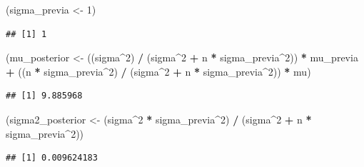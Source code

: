 \documentclass[
  12pt,
]{book}
\newenvironment{Shaded}{\begin{snugshade}}{\end{snugshade}}
\newcommand{\DecValTok}[1]{\textcolor[rgb]{0.00,0.00,0.81}{#1}}
\newcommand{\NormalTok}[1]{#1}
\newcommand{\OperatorTok}[1]{\textcolor[rgb]{0.81,0.36,0.00}{\textbf{#1}}}
\newcommand{\StringTok}[1]{\textcolor[rgb]{0.31,0.60,0.02}{#1}}
\begin{document}
\begin{Shaded}
\begin{Highlighting}[]
\NormalTok{(sigma\_previa \textless{}{-}}\StringTok{ }\DecValTok{1}\NormalTok{)}
\end{Highlighting}
\end{Shaded}

\begin{verbatim}
## [1] 1
\end{verbatim}

\begin{Shaded}
\begin{Highlighting}[]
\NormalTok{(mu\_posterior \textless{}{-}}\StringTok{ }\NormalTok{((sigma}\OperatorTok{\^{}}\DecValTok{2}\NormalTok{) }\OperatorTok{/}\StringTok{ }\NormalTok{(sigma}\OperatorTok{\^{}}\DecValTok{2} \OperatorTok{+}\StringTok{ }\NormalTok{n }\OperatorTok{*}\StringTok{ }\NormalTok{sigma\_previa}\OperatorTok{\^{}}\DecValTok{2}\NormalTok{)) }\OperatorTok{*}\StringTok{ }\NormalTok{mu\_previa }\OperatorTok{+}\StringTok{ }\NormalTok{((n }\OperatorTok{*}\StringTok{ }\NormalTok{sigma\_previa}\OperatorTok{\^{}}\DecValTok{2}\NormalTok{) }\OperatorTok{/}\StringTok{ }\NormalTok{(sigma}\OperatorTok{\^{}}\DecValTok{2} \OperatorTok{+}\StringTok{ }\NormalTok{n }\OperatorTok{*}\StringTok{ }\NormalTok{sigma\_previa}\OperatorTok{\^{}}\DecValTok{2}\NormalTok{)) }\OperatorTok{*}\StringTok{ }\NormalTok{mu)}
\end{Highlighting}
\end{Shaded}

\begin{verbatim}
## [1] 9.885968
\end{verbatim}

\begin{Shaded}
\begin{Highlighting}[]
\NormalTok{(sigma2\_posterior \textless{}{-}}\StringTok{ }\NormalTok{(sigma}\OperatorTok{\^{}}\DecValTok{2} \OperatorTok{*}\StringTok{ }\NormalTok{sigma\_previa}\OperatorTok{\^{}}\DecValTok{2}\NormalTok{) }\OperatorTok{/}\StringTok{ }\NormalTok{(sigma}\OperatorTok{\^{}}\DecValTok{2} \OperatorTok{+}\StringTok{ }\NormalTok{n }\OperatorTok{*}\StringTok{ }\NormalTok{sigma\_previa}\OperatorTok{\^{}}\DecValTok{2}\NormalTok{))}
\end{Highlighting}
\end{Shaded}

\begin{verbatim}
## [1] 0.009624183
\end{verbatim}
\end{document}
